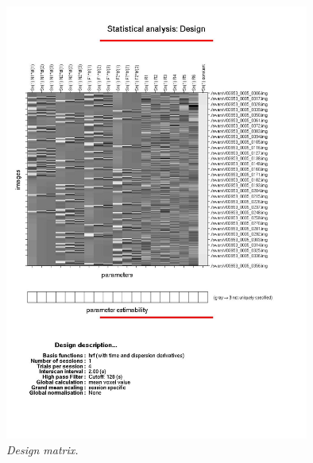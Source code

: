 \begin{figure}
\begin{center}
\includegraphics[width=100mm]{faces/cat_design}
\caption{\em Design matrix. \label{cat_design}}
\end{center}
\end{figure}

